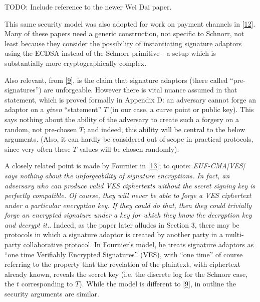 \documentclass[10pt,a4paper]{article}
\begin{document}
\vspace{5 pt}

TODO: Include reference to the newer Wei Dai paper.

\vspace{5 pt}
This same security model was also adopted for work on payment channels in {[}\protect\hyperlink{anchor-12}{12}{]}. Many of these papers need a generic construction, not specific to Schnorr, not least because they consider the possibility of instantiating signature adaptors using the ECDSA instead of the Schnorr primitive - a setup which is substantially more cryptographically complex.

\vspace{5 pt}
Also relevant, from {[}\protect\hyperlink{anchor-9}{9}{]}, is the claim that signature adaptors (there called ``pre-signatures'') are unforgeable. However there is vital nuance assumed in that statement, which is proved formally in Appendix D: an adversary cannot forge an adaptor on a \emph{given} ``statement'' $T$ (in our case, a curve point or public key). This says nothing about the ability of the adversary to create such a forgery on a random, not pre-chosen $T$; and indeed, this ability will be central to the below arguments. (Also, it can hardly be considered out of scope in practical protocols, since very often these $T$ values will be chosen randomly).

\vspace{5 pt}

A closely related point is made by Fournier in {[}\protect\hyperlink{anchor-13}{13}{]}; to quote: \emph{EUF-CMA[VES] says nothing about the unforgeability of signature encryptions. In fact, an adversary who can produce valid VES ciphertexts without the secret signing key is perfectly compatible. Of course, they will never be able to forge a VES ciphertext under a particular encryption key. If they could do that, then they could trivially forge an encrypted signature under a key for which they know the decryption key and decrypt it.}. Indeed, as the paper later alludes in Section 3, there may be protocols in which a signature adaptor is created by another party in a multi-party collaborative protocol. In Fournier's model, he treats signature adaptors as ``one time Verifiably Encrypted Signatures'' (VES), with ``one time'' of course referring to the property that the revelation of the plaintext, with ciphertext already known, reveals the secret key (i.e. the discrete log for the Schnorr case, the $t$ corresponding to $T$). While the model is different to {[}\protect\hyperlink{anchor-9}{9}{]}, in outline the security arguments are similar.
\end{document}
